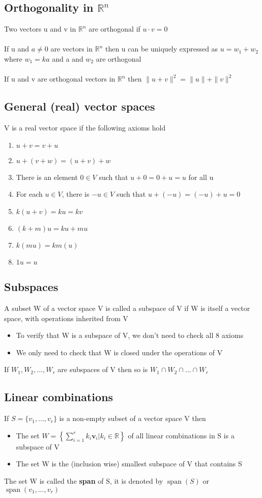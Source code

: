 \documentclass{article}[18pt]
\begin{document}
\subsection{Orthogonality in $\mathbb{R}^n$}
Two vectors u and v in $\mathbb{R}^n$ are orthogonal if $u\cdot v=0$\\
\\
If u and $a\neq 0$ are vectors in $\mathbb{R}^n$ then u can be uniquely expressed as $u=w_1+w_2$ where $w_1=ka$ and a and $w_2$ are orthogonal\\
\\
If u and v are orthogonal vectors in $\mathbb{R}^n$ then $\|u+v\|^2=\|u\|+\|v\|^2$
\subsection{General (real) vector spaces}
V is a real vector space if the following axioms hold
\begin{enumerate}
	\item $u+v=v+u$
	\item $u+(v+w)=(u+v)+w$
	\item There is an element $0\in V$ such that $u+0=0+u=u$ for all u
	\item For each $u\in V$, there is $-u\in V$ such that $u+(-u)=(-u)+u=0$
	\item $k(u+v)=ku=kv$
	\item $(k+m)u=ku+mu$
	\item $k(mu)=km(u)$
	\item $1u=u$
\end{enumerate}
\subsection{Subspaces}
A subset W of a vector space V is called a subspace of V if W is itself a vector space, with operations inherited from V
\begin{itemize}
	\item To verify that W is a subspace of V, we don't need to check all 8 axioms
	\item We only need to check that W is closed under the operations of V
\end{itemize}
If $W_1,W_2,...,W_r$ are subspaces of V then so is $W_1\cap W_2\cap \ldots \cap W_r$
\subsection{Linear combinations}
If $S=\{v_1,\ldots,v_r\}$ is a non-empty subset of a vector space V then
\begin{itemize}
	\item The set \(W=\left\{\sum_{i=1}^{r} k_{i} \mathbf{v}_{i} | k_{i} \in \mathbb{R}\right\}\) of all linear combinations in S is a subspace of V
	\item The set W is the (inclusion wise) smallest subspace of V that contains S
\end{itemize}
The set W is called the \textbf{span} of S, it is denoted by $\operatorname{span}(S)$ or $\operatorname{span}(v_1,\ldots,v_r)$
\end{document}
